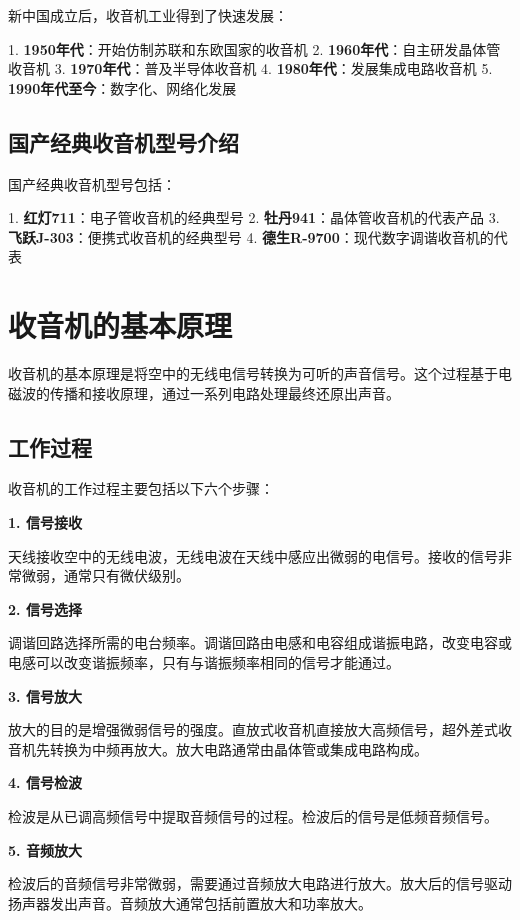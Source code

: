 \documentclass[12pt,UTF8]{ctexbook}
\begin{document}
新中国成立后，收音机工业得到了快速发展：

1. \textbf{1950年代}：开始仿制苏联和东欧国家的收音机
2. \textbf{1960年代}：自主研发晶体管收音机
3. \textbf{1970年代}：普及半导体收音机
4. \textbf{1980年代}：发展集成电路收音机
5. \textbf{1990年代至今}：数字化、网络化发展

\subsection{国产经典收音机型号介绍}

国产经典收音机型号包括：

1. \textbf{红灯711}：电子管收音机的经典型号
2. \textbf{牡丹941}：晶体管收音机的代表产品
3. \textbf{飞跃J-303}：便携式收音机的经典型号
4. \textbf{德生R-9700}：现代数字调谐收音机的代表

\section{收音机的基本原理}

收音机的基本原理是将空中的无线电信号转换为可听的声音信号。这个过程基于电磁波的传播和接收原理，通过一系列电路处理最终还原出声音。

\subsection{工作过程}

收音机的工作过程主要包括以下六个步骤：

\textbf{1. 信号接收}

天线接收空中的无线电波，无线电波在天线中感应出微弱的电信号。接收的信号非常微弱，通常只有微伏级别。

\textbf{2. 信号选择}

调谐回路选择所需的电台频率。调谐回路由电感和电容组成谐振电路，改变电容或电感可以改变谐振频率，只有与谐振频率相同的信号才能通过。

\textbf{3. 信号放大}

放大的目的是增强微弱信号的强度。直放式收音机直接放大高频信号，超外差式收音机先转换为中频再放大。放大电路通常由晶体管或集成电路构成。

\textbf{4. 信号检波}

检波是从已调高频信号中提取音频信号的过程。检波后的信号是低频音频信号。

\textbf{5. 音频放大}

检波后的音频信号非常微弱，需要通过音频放大电路进行放大。放大后的信号驱动扬声器发出声音。音频放大通常包括前置放大和功率放大。
\end{document}
